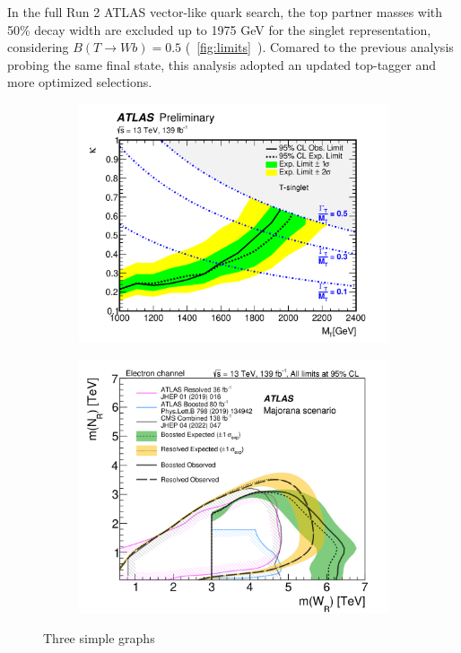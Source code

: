 \documentclass{moriond}
\begin{document}
In the full Run 2 ATLAS vector-like quark search, the top partner masses with
50\% decay width are excluded up to 1975 GeV for the singlet representation,
considering $B(T\rightarrow Wb)=0.5$ (~\ref{fig:limits}~).
Comared to the previous analysis probing the same final state, this analysis
adopted an updated top-tagger and more optimized selections.        

\begin{figure}[htbp!]
     \centering
     \begin{subfigure}[b]{0.45\textwidth}
         \centering
         \includegraphics[width=\textwidth]{VLQ}
         \caption{}
         \label{fig:vlq}
     \end{subfigure}
     \begin{subfigure}[b]{0.45\textwidth}
         \centering
         \includegraphics[width=\textwidth]{RHN}
         \caption{}
         \label{fig:rhn}
     \end{subfigure}
        \caption{Three simple graphs}
        \label{fig:diagrams}
\end{figure}
\end{document}

